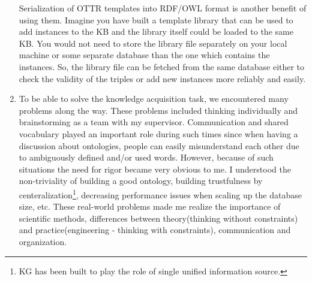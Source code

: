 \begin{enumerate}[wide=0pt]
Serialization of OTTR templates into RDF/OWL format is another benefit of using them. Imagine you have 
built a template library that can be used to add instances to the KB and the library itself could be 
loaded to the same KB. You would not need to store the library file separately on your local machine or 
some separate database than the one which contains the instances. So, the library file can be fetched 
from the same database either to check the validity of the triples or add new instances more reliably and 
easily.


\item To be able to solve the knowledge acquisition task, we encountered many problems along the way. These 
problems included thinking individually and brainstorming as a team with my supervisor. Communication 
and shared vocabulary played an important role during such times since when having a discussion about 
ontologies, people can easily misunderstand each other due to ambiguously defined and/or used words. 
However, because of such situations the need for rigor became very obvious to me. I understood the 
non-triviality of building a good ontology, building trustfulness by centeralization\footnote{KG has 
been built to play the role of single unified information source.}, decreasing performance issues 
when scaling up the database size, etc. These real-world problems made me realize the importance of 
scientific methods, differences between theory(thinking without constraints) and practice(engineering 
- thinking with constraints), communication and organization.
\end{enumerate}

% 
